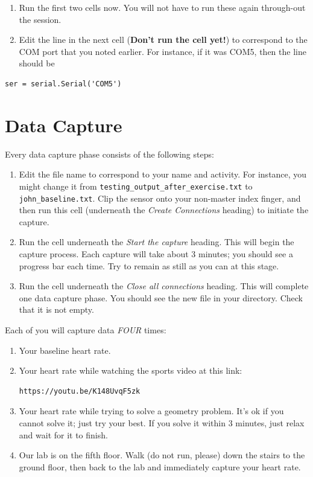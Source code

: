 \documentclass[11pt]{article}
\providecommand{\tightlist}{%
  \setlength{\itemsep}{0pt}\setlength{\parskip}{0pt}}
\begin{document}
\begin{enumerate}
\def\labelenumi{\arabic{enumi}.}
\setcounter{enumi}{4}
\tightlist
\item
  Run the first two cells now. You will not have to run these again
  through-out the session.
\item
  Edit the line in the next cell (\textbf{Don't run the cell yet!}) to
  correspond to the COM port that you noted earlier. For instance, if it
  was COM5, then the line should be
\end{enumerate}

\begin{verbatim}
ser = serial.Serial('COM5')
\end{verbatim}

\hypertarget{data-capture}{%
\section{Data Capture}\label{data-capture}}

Every data capture phase consists of the following steps:

\begin{enumerate}
\def\labelenumi{\arabic{enumi}.}
\tightlist
\item
  Edit the file name to correspond to your name and activity. For
  instance, you might change it from
  \texttt{testing\_output\_after\_exercise.txt} to
  \texttt{john\_baseline.txt}. Clip the sensor onto your non-master
  index finger, and then run this cell (underneath the \emph{Create
  Connections} heading) to initiate the capture.
\item
  Run the cell underneath the \emph{Start the capture} heading. This
  will begin the capture process. Each capture will take about 3
  minutes; you should see a progress bar each time. Try to remain as
  still as you can at this stage.
\item
  Run the cell underneath the \emph{Close all connections} heading. This
  will complete one data capture phase. You should see the new file in
  your directory. Check that it is not empty.
\end{enumerate}

Each of you will capture data \emph{FOUR} times:

\begin{enumerate}
\def\labelenumi{\arabic{enumi}.}
\tightlist
\item
  Your baseline heart rate.
\item
  Your heart rate while watching the sports video at this link:
\begin{verbatim}
https://youtu.be/K148UvqF5zk
\end{verbatim}

\item
  Your heart rate while trying to solve a geometry problem. It's ok if
  you cannot solve it; just try your best. If you solve it within 3
  minutes, just relax and wait for it to finish.
\item
  Our lab is on the fifth floor. Walk (do not run, please) down the
  stairs to the ground floor, then back to the lab and immediately
  capture your heart rate.
\end{enumerate}
\end{document}
